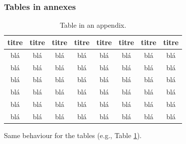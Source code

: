\documentclass[letterpaper%
, twoside%
, 12pt%
,these%
, english%
,creativecommons,hyperref%
]{thETS}
\begin{document}
\subsubsection{Tables in annexes}

\begin{table}
		\parbox{0.65\textwidth}{\caption{Table in an appendix.}\label{tab:testAp}}

		\begin{tabular}{|c|c|c|c|c|c|c|c|}
		\hline
			{\bf titre} & {\bf titre} & {\bf titre} & {\bf titre} & {\bf titre} & {\bf titre} & {\bf titre} & {\bf titre} \\
	  \hline
			blá & blá & blá & blá & blá & blá & blá & blá \\
	  \hline
			blá & blá & blá & blá & blá & blá & blá & blá \\
	  \hline
			blá & blá & blá & blá & blá & blá & blá & blá \\
	  \hline
			blá & blá & blá & blá & blá & blá & blá & blá \\
	  \hline
			blá & blá & blá & blá & blá & blá & blá & blá \\
	  \hline
			blá & blá & blá & blá & blá & blá & blá & blá \\
	  \hline
		\end{tabular}
\end{table}

Same behaviour for the tables (e.g., Table \ref{tab:testAp}).



\newpage
\begin{spacing}{1}  
	\nocite{*} %
	
	
\end{spacing}


\newpage
\begin{spacing}{1} 

	
\end{spacing}
\end{document}
